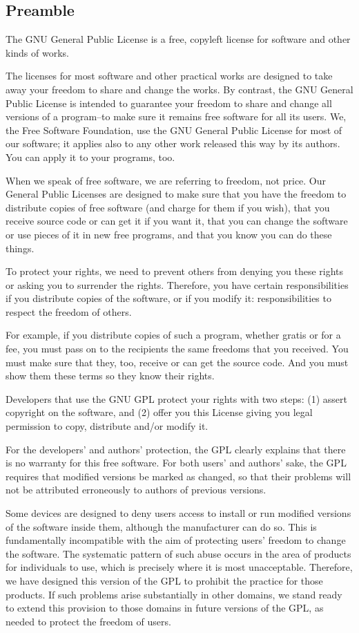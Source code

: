 \subsection{Preamble}
The GNU General Public License is a free, copyleft license for software and other kinds of works.\par
The licenses for most software and other practical works are designed to take away your freedom to share and change the works. By contrast, the GNU General Public License is intended to guarantee your freedom to share and change all versions of a program--to make sure it remains free software for all its users. We, the Free Software Foundation, use the GNU General Public License for most of our software; it applies also to any other work released this way by its authors. You can apply it to your programs, too.\par
When we speak of free software, we are referring to freedom, not price. Our General Public Licenses are designed to make sure that you have the freedom to distribute copies of free software (and charge for them if you wish), that you receive source code or can get it if you want it, that you can change the software or use pieces of it in new free programs, and that you know you can do these things.\par
To protect your rights, we need to prevent others from denying you these rights or asking you to surrender the rights. Therefore, you have certain responsibilities if you distribute copies of the software, or if you modify it: responsibilities to respect the freedom of others.\par
For example, if you distribute copies of such a program, whether gratis or for a fee, you must pass on to the recipients the same freedoms that you received. You must make sure that they, too, receive or can get the source code. And you must show them these terms so they know their rights.\par
Developers that use the GNU GPL protect your rights with two steps: (1) assert copyright on the software, and (2) offer you this License giving you legal permission to copy, distribute and/or modify it.\par
For the developers' and authors' protection, the GPL clearly explains that there is no warranty for this free software. For both users' and authors' sake, the GPL requires that modified versions be marked as changed, so that their problems will not be attributed erroneously to authors of previous versions.\par
Some devices are designed to deny users access to install or run modified versions of the software inside them, although the manufacturer can do so. This is fundamentally incompatible with the aim of protecting users' freedom to change the software. The systematic pattern of such abuse occurs in the area of products for individuals to use, which is precisely where it is most unacceptable. Therefore, we have designed this version of the GPL to prohibit the practice for those products. If such problems arise substantially in other domains, we stand ready to extend this provision to those domains in future versions of the GPL, as needed to protect the freedom of users.\par
